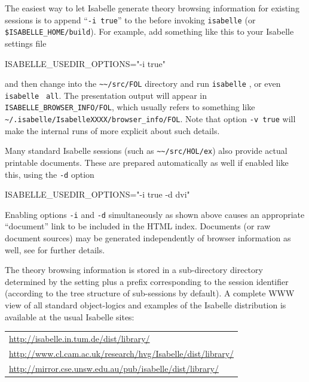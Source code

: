 \begin{isabellebody}
\begin{isamarkuptext}
  \medskip

  The easiest way to let Isabelle generate theory browsing information
  for existing sessions is to append ``\verb|-i true|'' to the
  \hyperlink{setting.ISABELLE-USEDIR-OPTIONS}{\mbox{}} before invoking \verb|isabelle| \hyperlink{tool.make}{\mbox{}} (or \verb|$ISABELLE_HOME/build|).  For
  example, add something like this to your Isabelle settings file

\begin{ttbox}
ISABELLE_USEDIR_OPTIONS="-i true"
\end{ttbox}

  and then change into the \verb|~~/src/FOL| directory and run
  \verb|isabelle| \hyperlink{tool.make}{\mbox{}}, or even \verb|isabelle|
  \hyperlink{tool.make}{\mbox{}}~\verb|all|.  The presentation output will appear
  in \verb|ISABELLE_BROWSER_INFO/FOL|, which usually refers to
  something like \verb|~/.isabelle/IsabelleXXXX/browser_info/FOL|.  Note that option
  \verb|-v true| will make the internal runs of \hyperlink{tool.usedir}{\mbox{}}
  more explicit about such details.

  Many standard Isabelle sessions (such as \verb|~~/src/HOL/ex|)
  also provide actual printable documents.  These are prepared
  automatically as well if enabled like this, using the \verb|-d| option
\begin{ttbox}
ISABELLE_USEDIR_OPTIONS="-i true -d dvi"
\end{ttbox}
  Enabling options \verb|-i| and \verb|-d|
  simultaneously as shown above causes an appropriate ``document''
  link to be included in the HTML index.  Documents (or raw document
  sources) may be generated independently of browser information as
  well, see  for further details.

  \bigskip The theory browsing information is stored in a
  sub-directory directory determined by the \hyperlink{setting.ISABELLE-BROWSER-INFO}{\mbox{}} setting plus a prefix corresponding to the
  session identifier (according to the tree structure of sub-sessions
  by default).  A complete WWW view of all standard object-logics and
  examples of the Isabelle distribution is available at the usual
  Isabelle sites:
  \begin{center}\small
  \begin{tabular}{l}
    \url{http://isabelle.in.tum.de/dist/library/} \\
    \url{http://www.cl.cam.ac.uk/research/hvg/Isabelle/dist/library/} \\
    \url{http://mirror.cse.unsw.edu.au/pub/isabelle/dist/library/} \\
  \end{tabular}
  \end{center}
  

\end{isamarkuptext}
\end{isabellebody}
